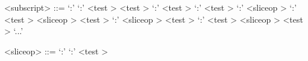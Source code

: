\label{subscriptb}

\begin{grammar}
<subscript> ::= `:'
	\alt `:' <test \myref[testb]>
	\alt <test \myref[testb]> `:'
	\alt <test \myref[testb]> `:' <test \myref[testb]>
	\alt `:' <sliceop \myref[sliceopb]>
	\alt `:' <test \myref[testb]> <sliceop \myref[sliceopb]>
	\alt <test \myref[testb]> `:' <sliceop \myref[sliceopb]>
	\alt <test \myref[testb]> `:' <test \myref[testb]> <sliceop \myref[sliceopb]>
	\alt <test \myref[testb]>
	\alt `...'
\end{grammar}


\label{sliceopb}

\begin{grammar}
<sliceop> ::= `:'
	\alt `:' <test \myref[testb]>
\end{grammar}


